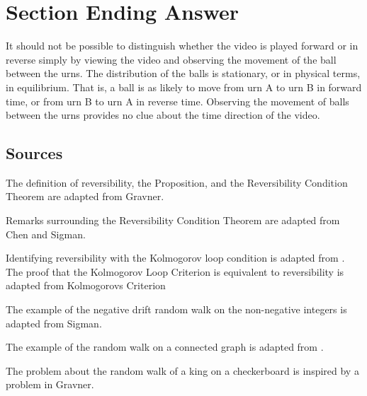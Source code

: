 \documentclass[12pt]{article}
\begin{document}
\section*{Section Ending Answer}

It should not be possible to distinguish whether the video is played
forward or in reverse simply by viewing the video and observing the
movement of the ball between the urns.  The distribution of the balls is
stationary, or in physical terms, in equilibrium.  That is, a ball is as
likely to move from urn A to urn B in forward time, or from urn B to urn
A in reverse time.  Observing the movement of balls between the urns
provides no clue about the time direction of the video.

\subsection*{Sources}

The definition of reversibility, the Proposition, and the Reversibility
Condition Theorem are adapted from 
{Gravner}.

Remarks surrounding the Reversibility Condition Theorem are adapted from
{Chen} and 
{Sigman}.

Identifying reversibility with the Kolmogorov loop condition is adapted
from 
\cite{brill18}.  The proof that the Kolmogorov Loop Criterion is
equivalent to reversibility is adapted from
{Kolmogorovs Criterion}

The example of the negative drift random walk on the non-negative
integers is adapted from 
{Sigman}.

The example of the random walk on a connected graph is adapted from
.

The problem about the random walk of a king on a checkerboard is
inspired by a problem in 
{Gravner}.
\end{document}
